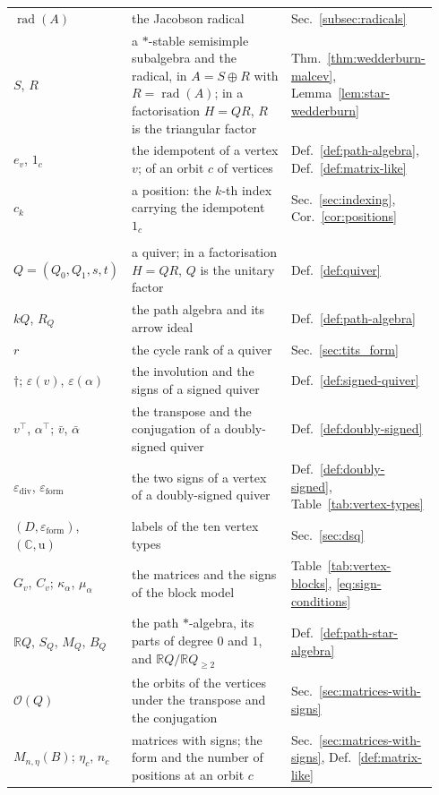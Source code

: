 \documentclass[12pt, a4paper]{report}
\theoremstyle{plain}
\theoremstyle{definition}
\theoremstyle{remark}
\theoremstyle{plain}
\newcommand{\rad}[0]{\operatorname{rad}} %
\newcommand{\epsilondiv}{\varepsilon_{\mathrm{div}}}
\newcommand{\epsilonform}{\varepsilon_{\mathrm{form}}}
\newcommand{\RR}{\mathbb{R}}
\newcommand{\CC}{\mathbb{C}}
\begin{document}
\begin{singlespace}
{\begin{longtable}{@{}>{\raggedright\arraybackslash}p{0.2\linewidth}>{\raggedright\arraybackslash}p{0.56\linewidth}>{\raggedright\arraybackslash}p{0.18\linewidth}@{}}
$\rad(A)$ & the Jacobson radical & Sec.~\ref{subsec:radicals} \\
$S$, $R$ & a $*$-stable semisimple subalgebra and the radical, in $A=S\oplus R$ with $R=\rad(A)$; in a factorisation $H=QR$, $R$ is the triangular factor & Thm.~\ref{thm:wedderburn-malcev}, Lemma~\ref{lem:star-wedderburn} \\
$e_v$, $1_c$ & the idempotent of a vertex $v$; of an orbit $c$ of vertices & Def.~\ref{def:path-algebra}, Def.~\ref{def:matrix-like} \\
$c_k$ & a position: the $k$-th index carrying the idempotent $1_c$ & Sec.~\ref{sec:indexing}, Cor.~\ref{cor:positions} \\
\addlinespace
\multicolumn{3}{@{}l}{\emph{Quivers}} \\
$Q=(Q_0,Q_1,s,t)$ & a quiver; in a factorisation $H=QR$, $Q$ is the unitary factor & Def.~\ref{def:quiver} \\
$kQ$, $R_Q$ & the path algebra and its arrow ideal & Def.~\ref{def:path-algebra} \\
$r$ & the cycle rank of a quiver & Sec.~\ref{sec:tits_form} \\
$\dagger$; $\varepsilon(v)$, $\varepsilon(\alpha)$ & the involution and the signs of a signed quiver & Def.~\ref{def:signed-quiver} \\
$v^{\top}$, $\alpha^{\top}$; $\bar v$, $\bar\alpha$ & the transpose and the conjugation of a doubly-signed quiver & Def.~\ref{def:doubly-signed} \\
$\epsilondiv$, $\epsilonform$ & the two signs of a vertex of a doubly-signed quiver & Def.~\ref{def:doubly-signed}, Table~\ref{tab:vertex-types} \\
$(D,\epsilonform)$, $(\CC,\mathrm u)$ & labels of the ten vertex types & Sec.~\ref{sec:dsq} \\
$G_v$, $C_v$; $\kappa_\alpha$, $\mu_\alpha$ & the matrices and the signs of the block model & Table~\ref{tab:vertex-blocks}, \eqref{eq:sign-conditions} \\
$\RR Q$, $S_Q$, $M_Q$, $B_Q$ & the path $*$-algebra, its parts of degree $0$ and $1$, and $\RR Q/\RR Q_{\geq2}$ & Def.~\ref{def:path-star-algebra} \\
$\mathcal O(Q)$ & the orbits of the vertices under the transpose and the conjugation & Sec.~\ref{sec:matrices-with-signs} \\
$M_{n,\eta}(B)$; $\eta_c$, $n_c$ & matrices with signs; the form and the number of positions at an orbit $c$ & Sec.~\ref{sec:matrices-with-signs}, Def.~\ref{def:matrix-like} \\

\end{longtable}}
\end{singlespace}
\end{document}
